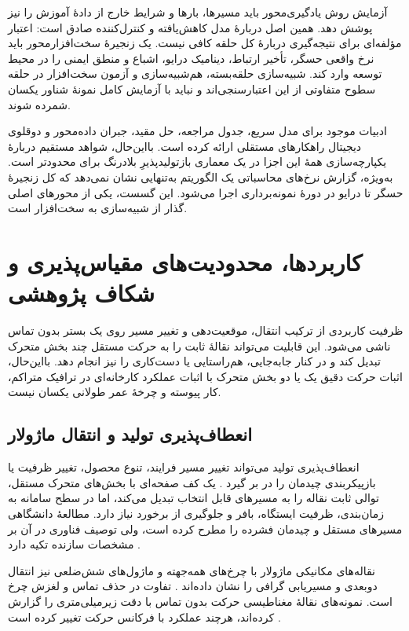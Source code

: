 آزمایش روش یادگیری‌محور باید مسیرها، بارها و شرایط خارج از دادهٔ آموزش را نیز پوشش دهد. همین اصل دربارهٔ مدل کاهش‌یافته و کنترل‌کننده صادق است: اعتبار مؤلفه‌ای برای نتیجه‌گیری دربارهٔ کل حلقه کافی نیست. یک زنجیرهٔ سخت‌افزارمحور باید نرخ واقعی حسگر، تأخیر ارتباط، دینامیک درایو، اشباع و منطق ایمنی را در محیط توسعه وارد کند. شبیه‌سازی حلقه‌بسته، هم‌شبیه‌سازی و آزمون سخت‌افزار در حلقه سطوح متفاوتی از این اعتبارسنجی‌اند و نباید با آزمایش کامل نمونهٔ شناور یکسان شمرده شوند.

\label{subsec:data-driven-intelligent-summary}
ادبیات موجود برای مدل سریع، جدول مراجعه، حل مقید، جبران داده‌محور و دوقلوی دیجیتال راهکارهای مستقلی ارائه کرده است. بااین‌حال، شواهد مستقیم دربارهٔ یکپارچه‌سازی همهٔ این اجزا در یک معماری بازتولیدپذیرِ بلادرنگ برای  محدودتر است. به‌ویژه، گزارش نرخ‌های محاسباتی یک الگوریتم به‌تنهایی نشان نمی‌دهد که کل زنجیرهٔ حسگر تا درایو در دورهٔ نمونه‌برداری اجرا می‌شود. این گسست، یکی از محورهای اصلی گذار از شبیه‌سازی به سخت‌افزار است.


\section{کاربردها، محدودیت‌های مقیاس‌پذیری و شکاف پژوهشی}

ظرفیت کاربردی  از ترکیب انتقال، موقعیت‌دهی و تغییر مسیر روی یک بستر بدون تماس ناشی می‌شود. این قابلیت می‌تواند نقالهٔ ثابت را به حرکت مستقل چند بخش متحرک تبدیل کند و در کنار جابه‌جایی، هم‌راستایی یا دست‌کاری را نیز انجام دهد. بااین‌حال، اثبات حرکت دقیق یک یا دو بخش متحرک با اثبات عملکرد کارخانه‌ای در ترافیک متراکم، کار پیوسته و چرخهٔ عمر طولانی یکسان نیست.

\subsection{انعطاف‌پذیری تولید و انتقال ماژولار}
\label{subsec:manufacturing-flexibility-modular-conveyance}

انعطاف‌پذیری تولید می‌تواند تغییر مسیر فرایند، تنوع محصول، تغییر ظرفیت یا بازپیکربندی چیدمان را در بر گیرد \cite{kaighobadiFlexibleManufacturingSystems1994}. یک کف صفحه‌ای با بخش‌های متحرک مستقل، توالی ثابت نقاله را به مسیرهای قابل انتخاب تبدیل می‌کند، اما در سطح سامانه به زمان‌بندی، ظرفیت ایستگاه، بافر و جلوگیری از برخورد نیاز دارد. مطالعهٔ دانشگاهی  مسیرهای مستقل و چیدمان فشرده را مطرح کرده است، ولی توصیف فناوری در آن بر مشخصات سازنده تکیه دارد \cite{maoStudioDinamicoDi2024}.

نقاله‌های مکانیکی ماژولار با چرخ‌های همه‌جهته و ماژول‌های شش‌ضلعی نیز انتقال دوبعدی و مسیریابی گرافی را نشان داده‌اند \cite{uriarteControlStrategiesSmallscaled2019,sunThreewheelDrivenOmnidirectional2019}. تفاوت  در حذف تماس و لغزش چرخ است. نمونه‌های نقالهٔ مغناطیسی حرکت بدون تماس با دقت زیرمیلی‌متری را گزارش کرده‌اند، هرچند عملکرد با فرکانس حرکت تغییر کرده است \cite{wangCharacteristicAnalysisDisplacement2025}.

